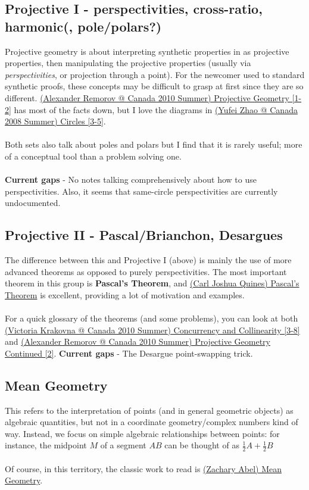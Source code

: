 	\subsection{Projective I - perspectivities, cross-ratio, harmonic(, pole/polars?)}
	Projective geometry is about interpreting synthetic properties in as projective properties, then manipulating the projective properties (usually via \textit{perspectivities}, or projection through a point). For the newcomer used to standard synthetic proofs, these concepts may be difficult to grasp at first since they are so different. \href{run:./F_geometry/(Alexander Remorov @ Canada 2010 Summer) Projective Geometry.pdf}{(Alexander Remorov @ Canada 2010 Summer) Projective Geometry [1-2]} has most of the facts down, but I love the diagrams in \href{run:./F_geometry/(Yufei Zhao @ Canada 2008 Summer) Circles.pdf}{(Yufei Zhao @ Canada 2008 Summer) Circles [3-5]}.\\\\
	Both sets also talk about poles and polars but I find that it is rarely useful; more of a conceptual tool than a problem solving one.\\\\
	\textbf{Current gaps} - No notes talking comprehensively about how to use perspectivities. Also, it seems that same-circle perspectivities are currently undocumented.
	\subsection{Projective II - Pascal/Brianchon, Desargues}
	The difference between this and Projective I (above) is mainly the use of more advanced theorems as opposed to purely perspectivities. The most important theorem in this group is \textbf{Pascal's Theorem}, and \href{run:./F_geometry/(Carl Joshua Quines) Pascal's Theorem.pdf}{(Carl Joshua Quines) Pascal's Theorem} is excellent, providing a lot of motivation and examples.\\\\
	For a quick glossary of the theorems (and some problems), you can look at both \href{run:./F_geometry/(Victoria Krakovna @ Canada 2010 Summer) Concurrency and Collinearity.pdf}{(Victoria Krakovna @ Canada 2010 Summer) Concurrency and Collinearity [3-8]} and \href{run:./F_geometry/(Alexander Remorov @ Canada 2010 Summer) Projective Geometry Continued.pdf}{(Alexander Remorov @ Canada 2010 Summer) Projective Geometry Continued [2]}.
	\textbf{Current gaps} -  The Desargue point-swapping trick.
	\subsection{Mean Geometry}
	This refers to the interpretation of points (and in general geometric objects) as algebraic quantities, but not in a coordinate geometry/complex numbers kind of way. Instead, we focus on simple algebraic relationships between points: for instance, the midpoint $M$ of a segment $AB$ can be thought of as $\frac{1}{2}A+\frac{1}{2}B$\\\\
	Of course, in this territory, the classic work to read is \href{run:./F_geometry/(Zachary Abel) Mean Geometry.pdf}{(Zachary Abel) Mean Geometry}.
